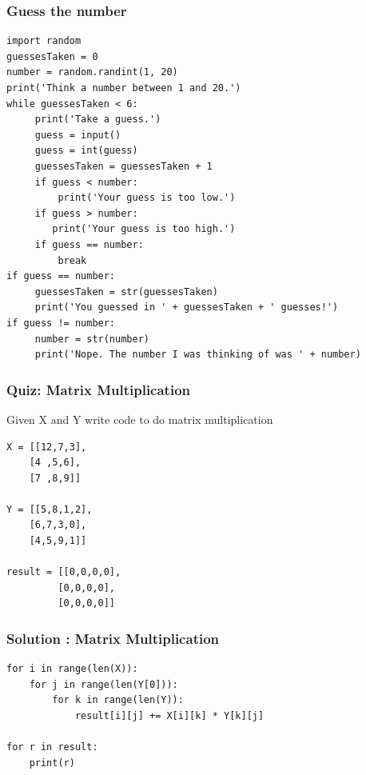 \begin{frame}[fragile]\frametitle{Guess the number}
\begin{lstlisting}
import random
guessesTaken = 0
number = random.randint(1, 20)
print('Think a number between 1 and 20.')
while guessesTaken < 6:
     print('Take a guess.') 
     guess = input()
     guess = int(guess)
     guessesTaken = guessesTaken + 1
     if guess < number:
         print('Your guess is too low.') 
     if guess > number:
        print('Your guess is too high.')
     if guess == number:
         break
if guess == number:
     guessesTaken = str(guessesTaken)
     print('You guessed in ' + guessesTaken + ' guesses!')
if guess != number:
     number = str(number)
     print('Nope. The number I was thinking of was ' + number)
\end{lstlisting}
\end{frame}

\begin{frame}[fragile]\frametitle{Quiz: Matrix Multiplication}
Given X and Y write code to do matrix multiplication
\begin{lstlisting}
X = [[12,7,3],
    [4 ,5,6],
    [7 ,8,9]]

Y = [[5,8,1,2],
    [6,7,3,0],
    [4,5,9,1]]

result = [[0,0,0,0],
         [0,0,0,0],
         [0,0,0,0]]
\end{lstlisting}

\end{frame}

\begin{frame}[fragile]\frametitle{Solution : Matrix Multiplication}

\begin{lstlisting}
for i in range(len(X)):
    for j in range(len(Y[0])):
        for k in range(len(Y)):
            result[i][j] += X[i][k] * Y[k][j]

for r in result:
    print(r)
\end{lstlisting}

\end{frame}

